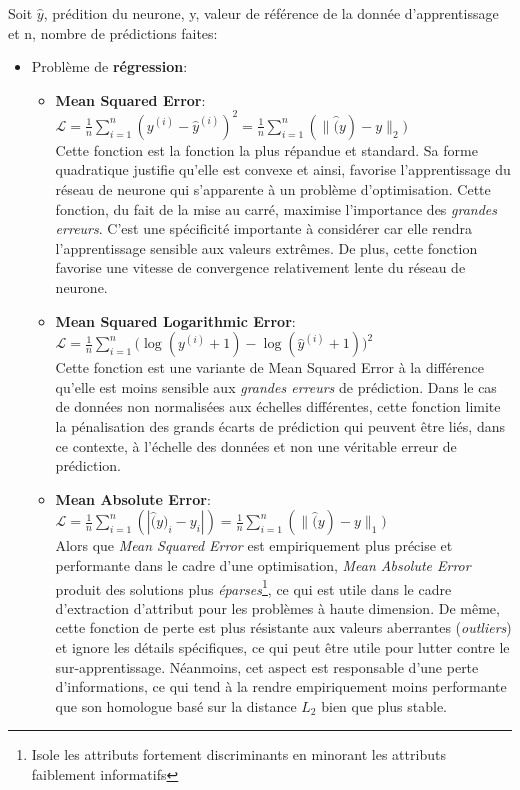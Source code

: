 \noindent Soit $\hat{y}$, prédition du neurone, y, valeur de référence de la donnée d'apprentissage et n, nombre de prédictions faites:
\begin{itemize}
    \item Problème de \textbf{régression}:
    \begin{itemize}
        \item \textbf{Mean Squared Error}: $\boldsymbol{\mathcal{L}}=\frac{1}{n}\sum_{i=1}^{n}(y^{(i)}-\hat{y}^{(i)})^{2}=\frac{1}{n}\sum_{i=1}^{n}(\| \hat(y) - y \|_2)$\\

        Cette fonction est la fonction la plus répandue et standard. Sa forme quadratique justifie qu'elle est convexe et ainsi, favorise l'apprentissage du réseau de neurone qui s'apparente à un problème d'optimisation. Cette fonction, du fait de la mise au carré, maximise l'importance des \textit{grandes erreurs}. C'est une spécificité importante à considérer car elle rendra l'apprentissage sensible aux valeurs extrêmes. De plus, cette fonction favorise une vitesse de convergence relativement lente du réseau de neurone.\\

        \item \textbf{ Mean Squared Logarithmic Error}: $\boldsymbol{\mathcal{L}}=\frac{1}{n}\sum_{i=1}^{n}\big(\log(y^{(i)}+1)-\log(\hat{y}^{(i)}+1)\big)^{2}$\\

        Cette fonction est une variante de Mean Squared Error à la différence qu'elle est moins sensible aux \textit{grandes erreurs} de prédiction. Dans le cas de données non normalisées aux échelles différentes, cette fonction limite la pénalisation des grands écarts de prédiction qui peuvent être liés, dans ce contexte, à l'échelle des données et non une véritable erreur de prédiction.\\

        \item \textbf{Mean Absolute Error}: $\boldsymbol{\mathcal{L}} = \frac{1}{n}\sum_{i=1}^{n}(|  \hat(y)_i - y_i |) = \frac{1}{n}\sum_{i=1}^{n}(\| \hat(y) - y \|_1)$\\

        Alors que \textit{Mean Squared Error} est empiriquement plus précise et performante dans le cadre d'une optimisation, \textit{Mean Absolute Error} produit des solutions plus \textit{éparses}\footnote{Isole les attributs fortement discriminants en minorant les attributs faiblement informatifs}, ce qui est utile dans le cadre d'extraction d'attribut pour les problèmes à haute dimension. De même, cette fonction de perte est plus résistante aux valeurs aberrantes (\textit{outliers}) et ignore les détails spécifiques, ce qui peut être utile pour lutter contre le sur-apprentissage. Néanmoins, cet aspect est responsable d'une perte d'informations, ce qui tend à la rendre empiriquement moins performante que son homologue basé sur la distance $L_2$ bien que plus stable. \\


\end{itemize}
\end{itemize}
